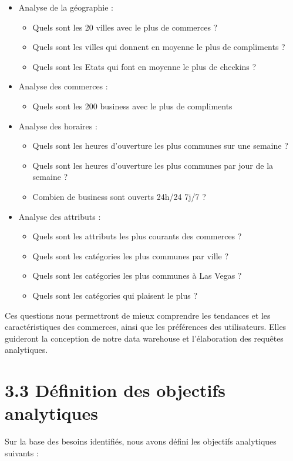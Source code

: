 \begin{itemize}
\item Analyse de la géographie :
\begin{itemize}
\item Quels sont les 20 villes avec le plus de commerces ?
\item Quels sont les villes qui donnent en moyenne le plus de compliments ?
\item Quels sont les Etats qui font en moyenne le plus de checkins ?
\end{itemize}
\item Analyse des commerces :
\begin{itemize}
\item Quels sont les 200 business avec le plus de compliments
\end{itemize}
\item Analyse des horaires :
\begin{itemize}
\item Quels sont les heures d'ouverture les plus communes sur une semaine ?
\item Quels sont les heures d'ouverture les plus communes par jour de la semaine ?
\item Combien de business sont ouverts 24h/24 7j/7 ?
\end{itemize}
\item Analyse des attributs :
\begin{itemize}
\item Quels sont les attributs les plus courants des commerces ?
\item Quels sont les catégories les plus communes par ville ?
\item Quels sont les catégories les plus communes à Las Vegas ?
\item Quels sont les catégories qui plaisent le plus ?
\end{itemize}
\end{itemize}

Ces questions nous permettront de mieux comprendre les tendances et les caractéristiques des commerces, ainsi que les préférences des utilisateurs.
Elles guideront la conception de notre data warehouse et l’élaboration des requêtes analytiques.


\section*{3.3 Définition des objectifs analytiques}

Sur la base des besoins identifiés, nous avons défini les objectifs analytiques suivants :

